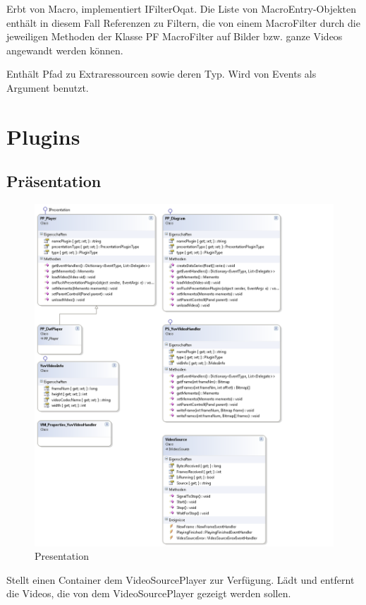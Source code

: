 Erbt von Macro, implementiert IFilterOqat. Die Liste von MacroEntry-Objekten enthält in diesem Fall Referenzen zu Filtern, die von einem MacroFilter durch die jeweiligen Methoden der Klasse PF MacroFilter auf Bilder bzw. ganze Videos angewandt werden können.


Enthält Pfad zu Extraressourcen sowie deren Typ. Wird von Events als Argument benutzt.

\pagebreak
\section{Plugins}
\subsection{Präsentation}
\begin{figure}[H]
\noindent\includegraphics[width=\linewidth,height=\textheight,
keepaspectratio]{bilder/Klassendiagramm/Plugins1.png}
\caption{Presentation}
\end{figure}

Stellt einen Container dem VideoSourcePlayer zur Verfügung. Lädt und entfernt die Videos, die von dem VideoSourcePlayer gezeigt werden sollen.


